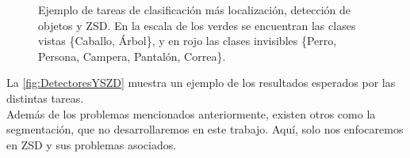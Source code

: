 \begin{figure}[]
  \centering
  \caption{Ejemplo de tareas de clasificación más localización, detección de objetos y ZSD. En la escala de los verdes se encuentran las clases vistas \{Caballo, Árbol\}, y en rojo las clases invisibles \{Perro, Persona, Campera, Pantalón, Correa\}.}
  \label{fig:DetectoresYSZD}
\end{figure}

La \autoref{fig:DetectoresYSZD} muestra un ejemplo de los resultados esperados por las distintas tareas.\\

Además de los problemas mencionados anteriormente, existen otros como la segmentación, que no desarrollaremos en este trabajo. Aquí, solo nos enfocaremos en ZSD y sus problemas asociados.
 
